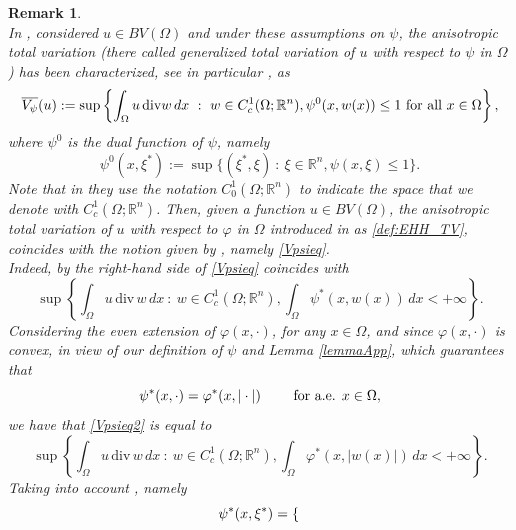 \documentclass[a4paper,11pt,oneside,notitlepage]{article}
\newtheorem{remark}[theorem]{Remark}
\numberwithin{equation}{section}
\def\R{\mathbb{R}}
\renewcommand{\div}{\mathrm{div}}
\newcommand{\vphi}{\varphi}
\newcommand{\st}{ \ : \ }
\begin{document}
\begin{remark}
    \\
    In \cite{AB}, considered $u \in BV(\Omega)$ and under these assumptions on $\psi$, the anisotropic total variation (there called {\it generalized total variation of $u$ with respect to $\psi$ in $\Omega$}) has been characterized, see in particular \cite[Proposition 3.2]{AB}, as
    \begin{equation}
    \label{Vpsieq}
        \overline{V_\psi}(u) := \sup \left\{\int_\Omega u \, \div w \, dx \st w \in C^1_c(\Omega;\R^n), \psi^0(x,w(x)) \le 1 \textnormal{ for all } x \in \Omega \right\}, 
    \end{equation}    
    where $\psi^0$ is the dual function of $\psi$, namely
    \begin{equation*}
        \psi^0(x, \xi^*) := \sup \{(\xi^*, \xi) \st \xi \in \R^n, \psi(x, \xi) \le 1\}.
    \end{equation*}
    Note that in \cite{AB} they use the notation $C^1_0(\Omega;\R^n)$ to indicate the space that we denote with $C^1_c(\Omega;\R^n)$. Then, given a function $u \in BV(\Omega)$, the anisotropic total variation of $u$ with respect to $\vphi$ in $\Omega$ introduced in \cite{EHH} as \eqref{def:EHH_TV}, coincides with the notion given by \cite{AB}, namely \eqref{Vpsieq}.
    \\
    Indeed, by \cite[(5.10)]{AB} the right-hand side of \eqref{Vpsieq} coincides with
    \begin{equation}
    \label{Vpsieq2}
        \sup\left\{\int_\Omega u \, \div \, w \, dx \st w \in C^1_c(\Omega;\R^n), \int_\Omega \psi^*(x, w(x)) \, dx < +\infty \right\}.
    \end{equation}
    Considering the even extension of $\vphi(x,\cdot)$, for any $x \in \Omega$, and since $\vphi(x,\cdot)$ is convex, in view of our definition of $\psi$ and Lemma \ref{lemmaApp}, which guarantees that
    \begin{equation}
    \label{psi*varphi*mod}
        \psi^*(x,\cdot)= \vphi^*(x,|\cdot|) \qquad \textnormal{ for a.e. } x \in \Omega,
    \end{equation}
    we have that \eqref{Vpsieq2} is equal to
    \begin{equation}
    \label{Vpsieq3}
        \sup \left\{\int_\Omega u \, \div \, w \, dx \st w \in C^1_c(\Omega;\R^n), \int_\Omega \vphi^*(x, |w(x)|) \, dx < +\infty \right\}.
    \end{equation}
    Taking into account \cite[(2.18)]{AB}, namely
    \begin{equation*}
        \psi^*(x, \xi^*) =
        \begin{dcases}

\end{dcases}
\end{equation*}
\end{remark}
\end{document}
